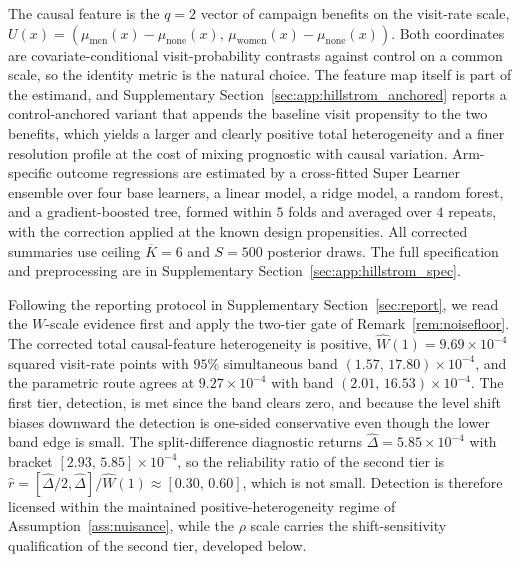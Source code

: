 \documentclass[11pt]{article}
\begin{document}
The causal feature is the $q=2$ vector of campaign benefits on the visit-rate scale, $U(x)=(\mu_{\mathrm{men}}(x)-\mu_{\mathrm{none}}(x),\,\mu_{\mathrm{women}}(x)-\mu_{\mathrm{none}}(x))$. Both coordinates are covariate-conditional visit-probability contrasts against control on a common scale, so the identity metric is the natural choice. The feature map itself is part of the estimand, and Supplementary Section~\ref{sec:app:hillstrom_anchored} reports a control-anchored variant that appends the baseline visit propensity to the two benefits, which yields a larger and clearly positive total heterogeneity and a finer resolution profile at the cost of mixing prognostic with causal variation. Arm-specific outcome regressions are estimated by a cross-fitted Super Learner ensemble \citep{vanderlaan2007super} over four base learners, a linear model, a ridge model, a random forest, and a gradient-boosted tree, formed within $5$ folds and averaged over $4$ repeats, with the correction applied at the known design propensities. All corrected summaries use ceiling $\overline K=6$ and $S=500$ posterior draws. The full specification and preprocessing are in Supplementary Section~\ref{sec:app:hillstrom_spec}.

Following the reporting protocol in Supplementary Section~\ref{sec:report}, we read the $W$-scale evidence first and apply the two-tier gate of Remark~\ref{rem:noisefloor}. The corrected total causal-feature heterogeneity is positive, $\widehat W(1)=9.69\times10^{-4}$ squared visit-rate points with $95\%$ simultaneous band $(1.57,\,17.80)\times10^{-4}$, and the parametric route agrees at $9.27\times10^{-4}$ with band $(2.01,\,16.53)\times10^{-4}$. The first tier, detection, is met since the band clears zero, and because the level shift biases downward the detection is one-sided conservative even though the lower band edge is small. The split-difference diagnostic returns $\widehat\Delta=5.85\times10^{-4}$ with bracket $[2.93,\,5.85]\times10^{-4}$, so the reliability ratio of the second tier is $\hat r=[\widehat\Delta/2,\widehat\Delta]/\widehat W(1)\approx[0.30,\,0.60]$, which is not small. Detection is therefore licensed within the maintained positive-heterogeneity regime of Assumption~\ref{ass:nuisance}, while the $\rho$ scale carries the shift-sensitivity qualification of the second tier, developed below.
\end{document}

